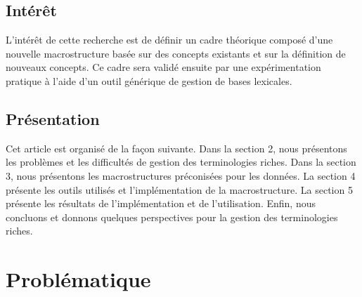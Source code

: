 \documentclass[10pt,a4paper,twoside]{article}
\begin{document}
\subsection{Intérêt}

L'intérêt de cette recherche est de définir un cadre théorique composé d'une nouvelle macrostructure basée sur des concepts existants et sur la définition de nouveaux concepts. Ce cadre sera validé ensuite par une expérimentation pratique à l'aide d'un outil générique de gestion de bases lexicales.

\subsection{Présentation}

Cet article est organisé de la façon suivante. Dans la section 2, nous présentons les problèmes et les difficultés de gestion des terminologies riches. Dans la section 3, nous présentons les macrostructures préconisées pour les données. La section 4 présente les outils utilisés et  l'implémentation de la macrostructure. La section 5 présente les résultats de l'implémentation et de l'utilisation. Enfin, nous concluons et donnons quelques perspectives pour la gestion des terminologies riches.

\section{Problématique}

\end{document}
